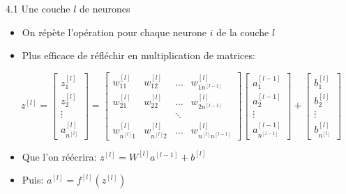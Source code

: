 \begin{frame}{4.1 Une couche $l$ de neurones}
  \begin{itemize}
  \item On répète l'opération pour chaque neurone $i$ de la couche $l$
  \item Plus efficace de réfléchir en multiplication de matrices:
  \end{itemize}
  \begin{equation*}
    z^{[l]} = \begin{bmatrix*} z_{1}^{[l]} \\ z_{2}^{[l]} \\ \vdots \\ a_{n^{[l]}}^{[l]} \end{bmatrix*} = \begin{bmatrix*} w_{11}^{[l]} & w_{12}^{[l]} & \dots & w_{1n^{[l-1]}}^{[l]} \\ w_{21}^{[l]} & w_{22}^{[l]} & \dots & w_{2n^{[l-1]}}^{[l]} \\ & & \ddots & \\ w_{n^{[l]}1}^{[l]} & w_{n^{[l]}2}^{[l]} & \dots & w_{n^{[l]}n^{[l-1]}}^{[l]} \end{bmatrix*} \begin{bmatrix*} a_{1}^{[l-1]} \\ a_{2}^{[l-1]} \\ \vdots \\ a_{n^{[l-1]}}^{[l-1]} \end{bmatrix*} + \begin{bmatrix*} b_{1}^{[l]} \\ b_{2}^{[l]} \\ \vdots \\ b_{n^{[l]}}^{[l]} \end{bmatrix*}
  \end{equation*}
  \begin{itemize}
  \item Que l'on réécrira: \boldmath $z^{[l]} = W^{[l]} a^{[l-1]} + b^{[l]}$
  \item Puis: \boldmath $a^{[l]} = f^{[l]}(z^{[l]})$
  \end{itemize}
\end{frame}

